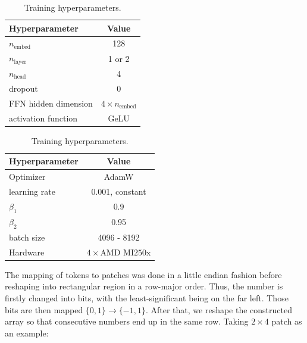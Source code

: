 \documentclass[3p, times,merge]{elsarticle}
\begin{document}
\begin{table}[H]
    \begin{minipage}{.5\linewidth}
    \centering
    \begin{tabular}{l c}
        \toprule
        Hyperparameter & Value \\
        \midrule
        $n_\text{embed}$ & 128 \\
        $n_\text{layer}$ & 1 or 2  \\
        $n_\text{head}$ & 4  \\
        dropout & 0  \\
        FFN hidden dimension & $4 \times n_\text{embed}$  \\
        activation function & GeLU  \\
        \bottomrule
        
    \end{tabular}
    \caption{}
    \label{tab:hyperparameters}
    \end{minipage}
    \begin{minipage}{.5\linewidth}
    \centering
    \begin{tabular}{l c}
        \toprule
        Hyperparameter & Value \\
        \midrule
        Optimizer & AdamW \\
        learning rate & 0.001, constant  \\
        $\beta_1$ & 0.9  \\
        $\beta_2$ & 0.95  \\
        batch size & 4096 - 8192 \\
        Hardware & $4 \times \text{AMD MI250x}$\\
        \bottomrule
        
    \end{tabular}
    \caption{Training hyperparameters.}
    \label{tab:hyperparameters_2}
    \end{minipage}
\end{table}
The mapping of tokens to patches was done in a little endian fashion before reshaping into rectangular region in a row-major order. Thus, the number is firstly changed into bits, with the least-significant being on the far left. Those bits are then mapped $\{0, 1\} \xrightarrow{} \{-1, 1\}$. After that, we reshape the constructed array so that consecutive numbers end up in the same row. Taking $2 \times 4$ patch as an example:
\end{document}
